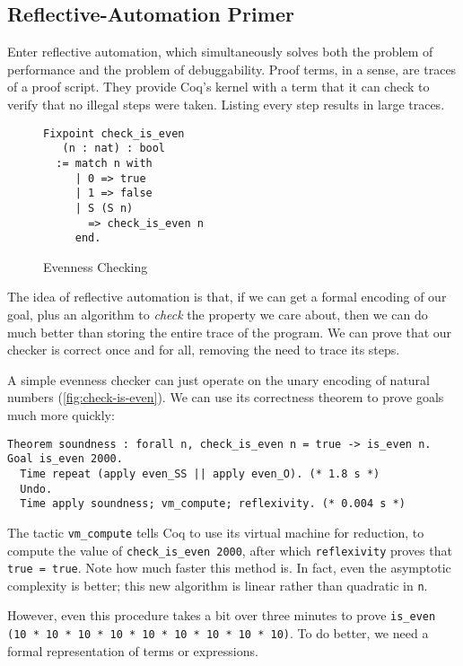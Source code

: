 \subsection{Reflective-Automation Primer}\label{sec:evenness}
Enter reflective automation, which simultaneously solves both the problem of performance and the problem of debuggability.
Proof terms, in a sense, are traces of a proof script.
They provide Coq's kernel with a term that it can check to verify that no illegal steps were taken.
Listing every step results in large traces.

\begin{wrapfigure}[9]{r}{5cm}
\begin{verbatim}
Fixpoint check_is_even
   (n : nat) : bool
  := match n with
     | 0 => true
     | 1 => false
     | S (S n)
       => check_is_even n
     end.
\end{verbatim}
\caption{Evenness Checking}\label{fig:check-is-even}
\end{wrapfigure}
The idea of reflective automation is that, if we can get a formal encoding of our goal, plus an algorithm to \emph{check} the property we care about, then we can do much better than storing the entire trace of the program.
We can prove that our checker is correct once and for all, removing the need to trace its steps.

A simple evenness checker can just operate on the unary encoding of natural numbers (\autoref{fig:check-is-even}).
We can use its correctness theorem to prove goals much more quickly:
\begin{verbatim}
Theorem soundness : forall n, check_is_even n = true -> is_even n.
Goal is_even 2000.
  Time repeat (apply even_SS || apply even_O). (* 1.8 s *)
  Undo.
  Time apply soundness; vm_compute; reflexivity. (* 0.004 s *)
\end{verbatim}
The tactic \texttt{vm_compute} tells Coq to use its virtual machine for reduction, to compute the value of \texttt{check_is_even 2000}, after which \texttt{reflexivity} proves that \texttt{true = true}.
Note how much faster this method is.
In fact, even the asymptotic complexity is better; this new algorithm is linear rather than quadratic in \texttt{n}.

However, even this procedure takes a bit over three minutes to prove \texttt{is_even (10 * 10 * 10 * 10 * 10 * 10 * 10 * 10 * 10)}.
To do better, we need a formal representation of terms or expressions.

